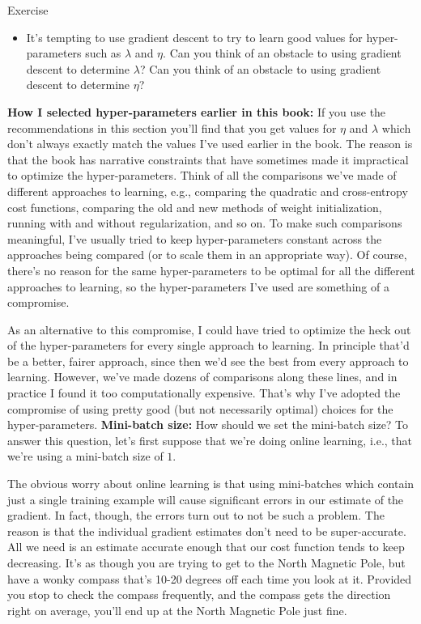 \begin{exerciseBox}{Exercise}


\begin{itemize}

\item It's tempting to use gradient descent to try to learn good values for hyper-parameters such as $\lambda$ and $\eta$. Can you think of an obstacle to using gradient descent to determine $\lambda$? Can you think of an obstacle to using gradient descent to determine $\eta$?

\end{itemize}


\textbf{How I selected hyper-parameters earlier in this book:} If you use the recommendations in this section you'll find that you get values for $\eta$ and $\lambda$ which don't always exactly match the values I've used earlier in the book. The reason is that the book has narrative constraints that have sometimes made it impractical to optimize the hyper-parameters. Think of all the comparisons we've made of different approaches to learning, e.g., comparing the quadratic and cross-entropy cost functions, comparing the old and new methods of weight initialization, running with and without regularization, and so on. To make such comparisons meaningful, I've usually tried to keep hyper-parameters constant across the approaches being compared (or to scale them in an appropriate way). Of course, there's no reason for the same hyper-parameters to be optimal for all the different approaches to learning, so the hyper-parameters I've used are something of a compromise.


As an alternative to this compromise, I could have tried to optimize the heck out of the hyper-parameters for every single approach to learning. In principle that'd be a better, fairer approach, since then we'd see the best from every approach to learning. However, we've made dozens of comparisons along these lines, and in practice I found it too computationally expensive. That's why I've adopted the compromise of using pretty good (but not necessarily optimal) choices for the hyper-parameters. \textbf{Mini-batch size:} How should we set the mini-batch size? To answer this question, let's first suppose that we're doing online learning, i.e., that we're using a mini-batch size of $1$.


The obvious worry about online learning is that using mini-batches which contain just a single training example will cause significant errors in our estimate of the gradient. In fact, though, the errors turn out to not be such a problem. The reason is that the individual gradient estimates don't need to be super-accurate. All we need is an estimate accurate enough that our cost function tends to keep decreasing. It's as though you are trying to get to the North Magnetic Pole, but have a wonky compass that's 10-20 degrees off each time you look at it. Provided you stop to check the compass frequently, and the compass gets the direction right on average, you'll end up at the North Magnetic Pole just fine.



\end{exerciseBox}
